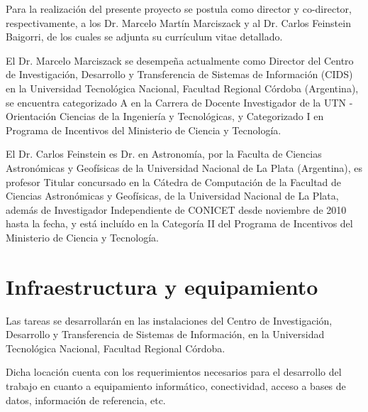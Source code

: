 \documentclass[
	11pt,oneside,a4paper,
	headsepline,footsepline,
	fleqn,
]{memoir}
\begin{document}
Para la realización del presente proyecto se postula como director y co-director, respectivamente, a los Dr. Marcelo Martín Marciszack y al Dr. Carlos Feinstein Baigorri, de los cuales se adjunta su currículum vitae detallado.

El Dr. Marcelo Marciszack se desempeña actualmente como Director del Centro de Investigación, Desarrollo y Transferencia de Sistemas de Información (CIDS) en la Universidad Tecnológica Nacional, Facultad Regional Córdoba (Argentina), se encuentra categorizado A en la Carrera de Docente Investigador de la UTN -
Orientación Ciencias de la Ingeniería y Tecnológicas, y Categorizado I
en Programa de Incentivos del Ministerio de Ciencia y Tecnología.

El Dr. Carlos Feinstein es Dr. en Astronomía, por la Faculta de Ciencias Astronómicas y Geofísicas de la Universidad Nacional de La Plata (Argentina), es profesor Titular concursado en la Cátedra de Computación de la Facultad de Ciencias Astronómicas y Geofísicas, de la Universidad Nacional de La Plata, además de Investigador Independiente de CONICET desde noviembre de 2010 hasta la fecha, y está incluído en la Categoría II del Programa de Incentivos del Ministerio de Ciencia y Tecnología.

\section {Infraestructura y equipamiento}

Las tareas se desarrollarán en las instalaciones del Centro de Investigación, Desarrollo y Transferencia de Sistemas de Información, en la Universidad Tecnológica Nacional, Facultad Regional Córdoba.

Dicha locación cuenta con los requerimientos necesarios para el desarrollo del trabajo en cuanto a equipamiento informático, conectividad, acceso a bases de datos, información de referencia, etc.


\printbibliography[heading=subbibliography]

\end{document}
